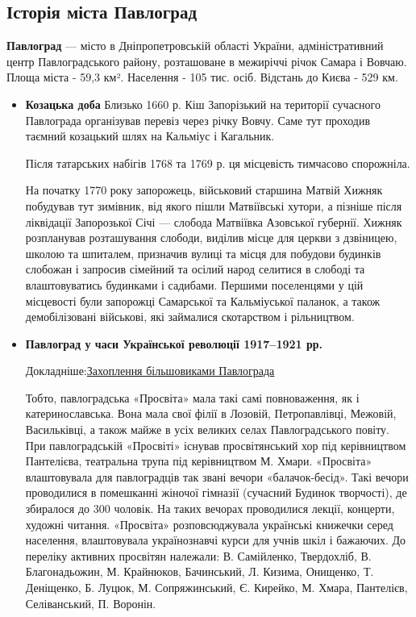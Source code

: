 \subsection{Історія міста Павлоград}
\textbf{Павлоград} — місто в Дніпропетровській області України, адміністративний центр Павлоградського району, розташоване в межиріччі річок Самара і Вовчаю. Площа міста - 59,3 км². Населення - 105 тис. осіб. Відстань до Києва - 529 км.
\begin{itemize}
	\item \textbf{Козацька доба} Близько 1660 р. Кіш Запорізький на території сучасного Павлограда організував перевіз через річку Вовчу. Саме тут проходив таємний козацький шлях на Кальміус і Кагальник.
	
	Після татарських набігів 1768 та 1769 р. ця місцевість тимчасово спорожніла.
	
	На початку 1770 року запорожець, військовий старшина Матвій Хижняк побудував тут зимівник, від якого пішли Матвіївські хутори, а пізніше після ліквідації Запорозької Січі — слобода Матвіївка Азовської губернії. Хижняк розпланував розташування слободи, виділив місце для церкви з дзвіницею, школою та шпиталем, призначив вулиці та місця для побудови будинків слобожан і запросив сімейний та осілий народ селитися в слободі та влаштовуватись будинками і садибами. Першими поселенцями у цій місцевості були запорожці Самарської та Кальміуської паланок, а також демобілізовані військові, які займалися скотарством і рільництвом.
	\item \textbf{Павлоград у часи Української революції 1917–1921 рр.}
	
	Докладніше:\href{https://uk.wikipedia.org/wiki/%D0%97%D0%B0%D1%85%D0%BE%D0%BF%D0%BB%D0%B5%D0%BD%D0%BD%D1%8F_%D0%B1%D1%96%D0%BB%D1%8C%D1%88%D0%BE%D0%B2%D0%B8%D0%BA%D0%B0%D0%BC%D0%B8_%D0%9F%D0%B0%D0%B2%D0%BB%D0%BE%D0%B3%D1%80%D0%B0%D0%B4%D0%B0}{Захоплення більшовиками Павлограда}
	
	Тобто, павлоградська «Просвіта» мала такі самі повноваження, як і катеринославська. Вона мала свої філії в Лозовій, Петропавлівці, Межовій, Васильківці, а також майже в усіх великих селах Павлоградського повіту. При павлоградській «Просвіті» існував просвітянський хор під керівництвом Пантелієва, театральна трупа під керівництвом М. Хмари. «Просвіта» влаштовувала для павлоградців так звані вечори «балачок-бесід». Такі вечори проводилися в помешканні жіночої гімназії (сучасний Будинок творчості), де збиралося до 300 чоловік. На таких вечорах проводилися лекції, концерти, художні читання. «Просвіта» розповсюджувала українські книжечки серед населення, влаштовувала українознавчі курси для учнів шкіл і бажаючих. До переліку активних просвітян належали: В. Самійленко, Твердохліб, В. Благонадьожин, М. Крайнюков, Бачинський, Л. Кизима, Онищенко, Т. Деніщенко, Б. Луцюк, М. Сопряжинський, Є. Кирейко, М. Хмара, Пантелієв, Селіванський, П. Воронін.
	

\end{itemize}
